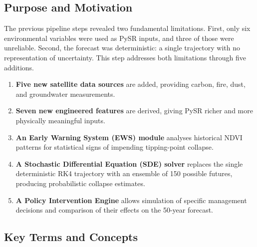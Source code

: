 \documentclass[12pt, a4paper]{article}
\begin{document}
\subsection{Purpose and Motivation}

The previous pipeline steps revealed two fundamental limitations. First,
only six environmental variables were used as PySR inputs, and three of
those were unreliable. Second, the forecast was deterministic: a single
trajectory with no representation of uncertainty. This step addresses both
limitations through five additions.

\begin{enumerate}
    \item \textbf{Five new satellite data sources} are added, providing
    carbon, fire, dust, and groundwater measurements.
    \item \textbf{Seven new engineered features} are derived, giving PySR
    richer and more physically meaningful inputs.
    \item \textbf{An Early Warning System (EWS) module} analyses historical
    NDVI patterns for statistical signs of impending tipping-point collapse.
    \item \textbf{A Stochastic Differential Equation (SDE) solver} replaces
    the single deterministic RK4 trajectory with an ensemble of 150 possible
    futures, producing probabilistic collapse estimates.
    \item \textbf{A Policy Intervention Engine} allows simulation of
    specific management decisions and comparison of their effects on the
    50-year forecast.
\end{enumerate}

\subsection{Key Terms and Concepts}
\end{document}
